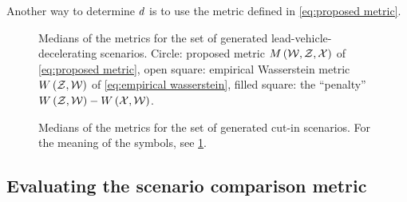 Another way to determine $d$ is to use the metric defined in \cref{eq:proposed metric}.


\setlength{\figureheight}{.8\figurewidth}
\begin{figure}
	\centering
	
	\caption{Medians of the metrics for the set of generated lead-vehicle-decelerating scenarios. Circle: proposed metric $M\left(\mathcal{W},\mathcal{Z},\mathcal{X}\right)$ of \cref{eq:proposed metric}, open square: empirical Wasserstein metric $W\left(\mathcal{Z},\mathcal{W}\right)$ of \cref{eq:empirical wasserstein}, filled square: the ``penalty'' $W\left(\mathcal{Z},\mathcal{W}\right) - W\left(\mathcal{X},\mathcal{W}\right)$.}
	\label{fig:scores lvd}
\end{figure}

\begin{figure}
	\centering
	
	\caption{Medians of the metrics for the set of generated cut-in scenarios. For the meaning of the symbols, see \cref{fig:scores lvd}.}
	\label{fig:scores ci}
\end{figure}



\subsection{Evaluating the scenario comparison metric}
\label{sec:case study comparison metric}

\setlength{\figureheight}{.8\figurewidth}
\begin{figure}
	\centering
	
\end{figure}

\begin{figure}
	\centering
	
\end{figure}

\begin{figure}
	
\end{figure}
